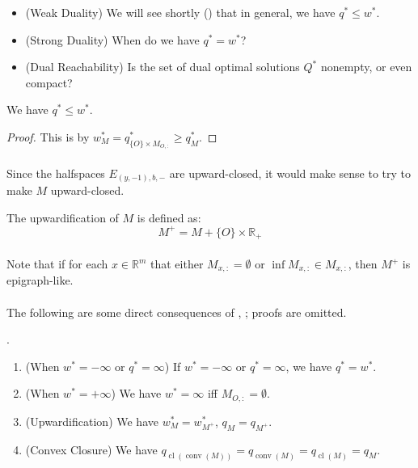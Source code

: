 \begin{itemize}
	\item (Weak Duality) We will see shortly () that in general, we have $q^\ast\leq w^\ast$.
	\item (Strong Duality) When do we have $q^\ast = w^\ast$?
	\item (Dual Reachability) Is the set of dual optimal solutions $Q^\ast$ nonempty, or even compact?
\end{itemize}

\begin{prop}\label{prop:031-weak-duality}
	We have $q^\ast\leq w^\ast$.
\end{prop}

\begin{proof}
	This is by $w_M^\ast = q^\ast_{\{O\}\times M_{O,:}} \geq q^\ast_M$.
\end{proof}

\paragraph{}Since the halfspaces $E_{(y,-1),b,-}$ are upward-closed, it would make sense to try to make $M$ upward-closed.

\begin{defn}[Upwardification]\label{defn:031-upwardification}
	The upwardification of $M$ is defined as:
	\[
		M^+= M+\{O\}\times \mathbb{R}_{+}
	\]
\end{defn}

\paragraph{}Note that if for each $x\in \mathbb{R}^m$ that either $M_{x,:}=\emptyset$ or $\inf M_{x,:}\in M_{x,:}$, then $M^+$ is epigraph-like.

\paragraph{}The following are some direct consequences of , ; proofs are omitted.

\begin{lemm}.
	\label{lemm:031-direct-consequences}
	\begin{enumerate}[label=(\alph*)]
		\item (When $w^\ast=-\infty$ or $q^\ast=\infty$) If $w^\ast=-\infty$ or $q^\ast=\infty$, we have $q^\ast=w^\ast$.
		\item (When $w^\ast=+\infty$) We have $w^\ast=\infty$ iff $M_{O,:}=\emptyset$.
		\item (Upwardification) We have $w_M^\ast=w_{M^+}^\ast$, $q_M=q_{M^+}$.
		\item (Convex Closure) We have $q_{\operatorname{cl}(\operatorname{conv}(M))}=q_{\operatorname{conv}(M)}=q_{\operatorname{cl}(M)}=q_M$.
	\end{enumerate}
\end{lemm}


